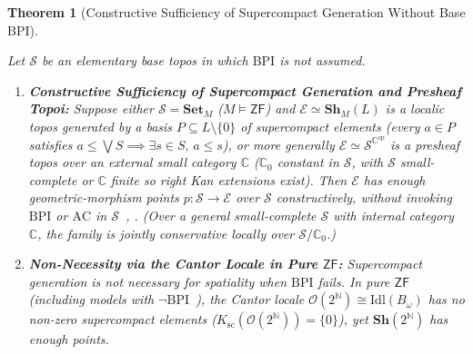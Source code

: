 \documentclass[10pt,twoside,openright]{book}
\theoremstyle{crmplain}
\newtheorem{theorem}{Theorem}[section]
\theoremstyle{crmdef}
\theoremstyle{crmremark}
\begin{document}
\begin{theorem}[Constructive Sufficiency of Supercompact Generation Without Base $\mathrm{BPI}$]\label{thm:deligne-deformed}%
%

Let $\mathcal{S}$ be an elementary base topos in which $\mathrm{BPI}$ is not assumed.

\begin{enumerate}[label=\textup{(\alph*)},leftmargin=2.0em]

  \item \textbf{Constructive Sufficiency of Supercompact Generation and Presheaf Topoi:} Suppose either $\mathcal{S} = \mathbf{Set}_M$ ($M \models \mathsf{ZF}$) and $\mathcal{E} \simeq \mathbf{Sh}_M(L)$ is a localic topos generated by a basis $P \subseteq L \setminus \{0\}$ of \emph{supercompact} elements (every $a \in P$ satisfies $a \le \bigvee S \implies \exists s \in S,\, a \le s$), or more generally $\mathcal{E} \simeq \mathcal{S}^{\mathbb{C}^{\mathrm{op}}}$ is a presheaf topos over an external small category $\mathbb{C}$ ($\mathbb{C}_0$ constant in $\mathcal{S}$, with $\mathcal{S}$ small-complete or $\mathbb{C}$ finite so right Kan extensions exist). Then $\mathcal{E}$ has enough geometric-morphism points $p : \mathcal{S} \to \mathcal{E}$ over $\mathcal{S}$ constructively, without invoking $\mathrm{BPI}$ or $\mathrm{AC}$ in $\mathcal{S}$~\cite[Ch.~II, \S\S 2--4]{Johnstone82}, \cite[\S D3.3]{Johnstone02}. (Over a general small-complete $\mathcal{S}$ with internal category $\mathbb{C}$, the family is jointly conservative locally over $\mathcal{S}/\mathbb{C}_0$.)

  \item \textbf{Non-Necessity via the Cantor Locale in Pure $\mathsf{ZF}$:} Supercompact generation is \emph{not} necessary for spatiality when $\mathrm{BPI}$ fails. In pure $\mathsf{ZF}$ (including models with $\neg\mathrm{BPI}$~\cite{HalpernLevy71,Jech73}), the Cantor locale $\mathcal{O}(2^{\mathbb{N}}) \cong \mathrm{Idl}(B_\omega)$ has \emph{no} non-zero supercompact elements ($K_{\mathrm{sc}}(\mathcal{O}(2^{\mathbb{N}})) = \{0\}$), yet $\mathbf{Sh}(2^{\mathbb{N}})$ has enough points.

\end{enumerate}

\end{theorem}
\end{document}
